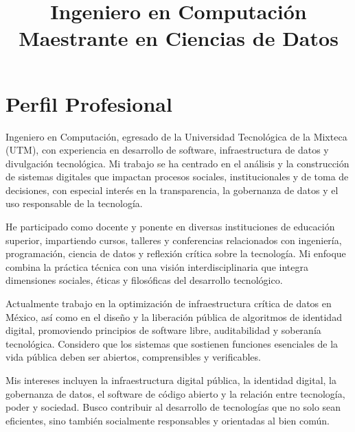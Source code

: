\documentclass[11pt,a4paper]{moderncv}
\title{Ingeniero en Computación\\
\small Maestrante en Ciencias de Datos}
\begin{document}
\makecvtitle


\section{Perfil Profesional}

Ingeniero en Computación, egresado de la Universidad Tecnológica de la Mixteca (UTM), con experiencia en desarrollo de software, infraestructura de datos y divulgación tecnológica. Mi trabajo se ha centrado en el análisis y la construcción de sistemas digitales que impactan procesos sociales, institucionales y de toma de decisiones, con especial interés en la transparencia, la gobernanza de datos y el uso responsable de la tecnología.



He participado como docente y ponente en diversas instituciones de educación superior, impartiendo cursos, talleres y conferencias relacionados con ingeniería, programación, ciencia de datos y reflexión crítica sobre la tecnología. Mi enfoque combina la práctica técnica con una visión interdisciplinaria que integra dimensiones sociales, éticas y filosóficas del desarrollo tecnológico.


Actualmente trabajo en la optimización de infraestructura crítica de datos en México, así como en el diseño y la liberación pública de algoritmos de identidad digital, promoviendo principios de software libre, auditabilidad y soberanía tecnológica. Considero que los sistemas que sostienen funciones esenciales de la vida pública deben ser abiertos, comprensibles y verificables.


Mis intereses incluyen la infraestructura digital pública, la identidad digital, la gobernanza de datos, el software de código abierto y la relación entre tecnología, poder y sociedad. Busco contribuir al desarrollo de tecnologías que no solo sean eficientes, sino también socialmente responsables y orientadas al bien común.








\end{document}

